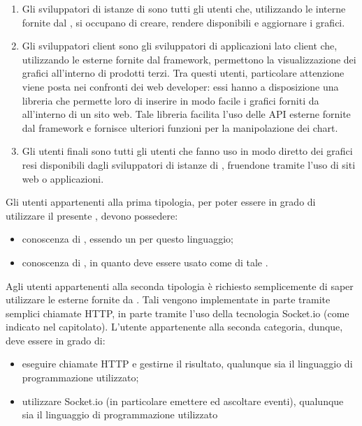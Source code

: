 		\begin{enumerate}
			\item Gli sviluppatori di istanze di  sono tutti gli utenti che, utilizzando le  interne fornite dal , si occupano di creare, rendere disponibili e aggiornare i grafici.
			\item Gli sviluppatori client sono gli sviluppatori di applicazioni lato client che, utilizzando le  esterne fornite dal framework, permettono la visualizzazione dei grafici all'interno di prodotti terzi. Tra questi utenti, particolare attenzione viene posta nei confronti dei web developer: essi hanno a disposizione una libreria che permette loro di inserire in modo facile i grafici forniti da  all'interno di un sito web. Tale libreria facilita l'uso delle API esterne fornite dal framework e fornisce ulteriori funzioni per la manipolazione dei chart.
			\item Gli utenti finali sono tutti gli utenti che fanno uso in modo diretto dei grafici resi disponibili dagli sviluppatori di istanze di , fruendone tramite l'uso di siti web o applicazioni.
		\end{enumerate}
		Gli utenti appartenenti alla prima tipologia, per poter essere in grado di utilizzare il presente , devono possedere:
		\begin{itemize}
			\item conoscenza di , essendo  un  per questo linguaggio;
			\item conoscenza di , in quanto  deve essere usato come  di tale .
		\end{itemize}
		Agli utenti appartenenti alla seconda tipologia è richiesto semplicemente di saper utilizzare le  esterne fornite da . Tali  vengono implementate in parte tramite semplici chiamate HTTP, in parte tramite l'uso della tecnologia Socket.io (come indicato nel capitolato). L'utente appartenente alla seconda categoria, dunque, deve essere in grado di:
		\begin{itemize}
			\item eseguire chiamate HTTP e gestirne il risultato, qualunque sia il linguaggio di programmazione utilizzato;
			\item utilizzare Socket.io (in particolare emettere ed ascoltare eventi), qualunque sia il linguaggio di programmazione utilizzato
		\end{itemize}
